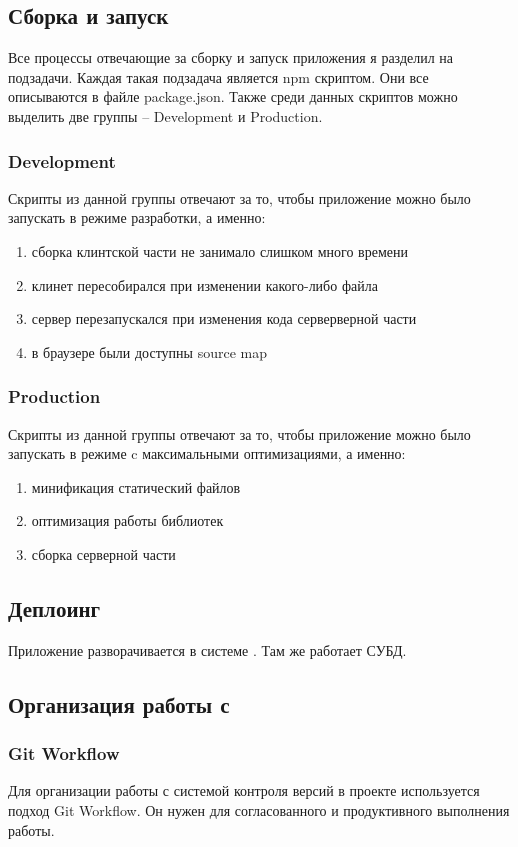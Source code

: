 \subsection{Сборка и запуск}
Все процессы отвечающие за сборку и запуск приложения я разделил на подзадачи. Каждая такая подзадача является npm скриптом. Они все описываются в файле package.json. Также среди данных скриптов можно выделить две группы -- Development и Production.

\subsubsection{Development}
Скрипты из данной группы отвечают за то, чтобы приложение можно было запускать в режиме разработки, а именно:
\begin{enumerate}
    \item сборка клинтской части не занимало слишком много времени
    \item клинет пересобирался при изменении какого-либо файла
    \item сервер перезапускался при изменения кода серверверной части
    \item в браузере были доступны source map
\end{enumerate}

\subsubsection{Production}
Скрипты из данной группы отвечают за то, чтобы приложение можно было запускать в режиме c максимальными оптимизациями, а именно:
\begin{enumerate}
    \item минификация статический файлов
    \item оптимизация работы библиотек
    \item сборка серверной части
\end{enumerate}

\subsection{Деплоинг}
Приложение разворачивается в системе \textcite{heroku}. Там же работает СУБД.

\subsection{Организация работы с \textcite{git}}
\subsubsection{Git Workflow}
Для организации работы с системой контроля версий в проекте используется подход Git Workflow. Он нужен для согласованного и продуктивного выполнения работы.

